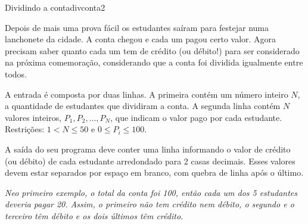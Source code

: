 \documentclass[12pt,a4paper,oneside]{article}
\begin{document}
\begin{problem}{Dividindo a conta}{divconta}{2}
 
Depois de mais uma prova fácil os estudantes saíram para festejar numa lanchonete da cidade. A conta chegou e cada um pagou certo valor. Agora precisam saber quanto cada um tem de crédito (ou débito!) para ser considerado na próxima comemoração, considerando que a conta foi dividida igualmente entre todos.

%

\InputFile

A entrada é composta por duas linhas. A primeira contém um número inteiro $N$, a quantidade de estudantes que dividiram a conta. A segunda linha contém $N$ valores inteiros, $P_1, P_2, \dots, P_N$, que indicam o valor pago por cada estudante.
Restrições: $1 < N \leq 50$ e $0 \leq P_i \leq 100$.

\OutputFile

A saída do seu programa deve conter uma linha informando o valor de crédito (ou débito) de cada estudante arredondado para 2 casas decimais. Esses valores devem estar separados por espaço em branco, com quebra de linha após o último.


\Example

\begin{example}
%
\end{example}

\begin{example}
%
\end{example}

\begin{example}
%
\end{example}


\small \textit{Neo primeiro exemplo, o total da conta foi 100, então cada um dos 5 estudantes deveria pagar 20. Assim, o primeiro não tem crédito nem débito, o segundo e o terceiro têm débito e os dois últimos têm crédito.}

\end{problem}
\end{document}
